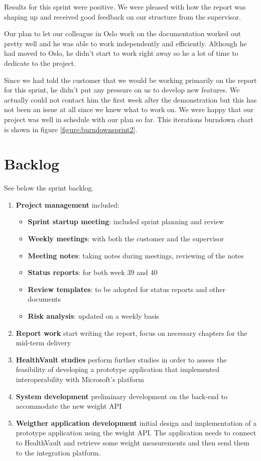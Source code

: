 Results for this sprint were positive. We were pleased with how the report was shaping up and received good feedback on our structure from the supervisor.

Our plan to let our colleague in Oslo work on the documentation worked out pretty well and he was able to work independently and efficiently. 
Although he had moved to Oslo, he didn't start to work right away so he a lot of time to dedicate to the project.

Since we had told the customer that we would be working primarily on the report for this sprint, he didn't put any pressure on us to develop new features. 
We actually could not contact him the first week after the demonstration but this has not been an issue at all since we knew what to work on. 
We were happy that our project was well in schedule with our plan so far.
This iterations burndown chart is shown in figure \ref{figure:burndownsprint2}.

\clearpage
\section{Backlog}

See below the sprint backlog.
\begin{enumerate}[1.]
	\item \textbf{Project management} included:
	\begin{itemize}
		\item \textbf{Sprint startup meeting}:
			included sprint planning and review
		\item \textbf{Weekly meetings}:
			with both the customer and the supervisor
		\item \textbf{Meeting notes}:
			taking notes during meetings, reviewing of the notes
		\item \textbf{Status reports}:
			for both week 39 and 40
		\item \textbf{Review templates}:
			to be adopted for status reports and other documents
		\item \textbf{Risk analysis}:
			updated on a weekly basis
	\end{itemize}
	\item \textbf{Report work}\newline
		start writing the report, focus on necessary chapters for the mid-term delivery
	\item \textbf{HealthVault studies}\newline
		perform further studies in order to assess the feasibility of developing a prototype
		application that implemented interoperability with Microsoft's platform
	\item \textbf{System development}\newline
		preliminary development on the back-end to accommodate the new weight API
	\item \textbf{Weigther application development}\newline
		initial design and implementation of a prototype application using the weight API.
		The application needs to connect to HealthVault and retrieve some weight measurements
		and then send them to the integration platform.
\end{enumerate}